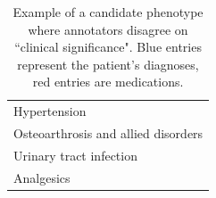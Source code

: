 \documentclass{sig-alternate-05-2015}
\begin{document}


\begin{table}
\begin{center}
\begin{tabular}{l}
\toprule
\color{blue}Hypertension \\
\color{blue}Osteoarthrosis and allied disorders \\
\color{blue}Urinary tract infection \\
\color{red}Analgesics\\
\bottomrule
\end{tabular}
\end{center}
\caption{Example of a candidate phenotype where annotators disagree on ``clinical significance". Blue entries represent the patient's diagnoses, red entries are medications.}
\label{tab:pheno-example}
\end{table}
\end{document}

